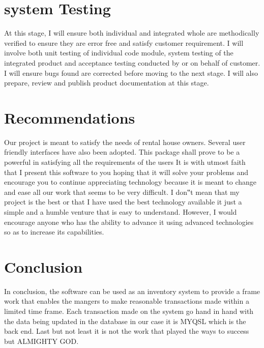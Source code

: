 \documentclass[]{report}
\begin{document}
\section{system Testing }
At this stage, I will ensure both individual and integrated whole are methodically verified to ensure they are error free and satisfy customer requirement. I will involve both unit testing of individual code module, system testing of the integrated product and acceptance testing conducted by or on behalf of customer. I will ensure bugs found are corrected before moving to the next stage. I will also prepare, review and publish product documentation at this stage. 

\section{Recommendations}
Our project is meant to satisfy the needs of rental house owners. Several user friendly interfaces have also been adopted. This package shall prove to be a powerful in satisfying all the requirements of the users It is with utmost faith that I present this software to you hoping that it will solve your problems and encourage you to continue appreciating technology because it is meant to change and ease all our work that seems to be very difficult. I don‟t mean that my project is the best or that I have used the best technology available it just a simple and a humble venture that is easy to understand. However, I would encourage anyone who has the ability to advance it using advanced technologies so as to increase its capabilities.

\section{Conclusion}
In conclusion, the software can be used as an inventory system to provide a frame work that enables the mangers to make reasonable transactions made within a limited time frame. Each transaction made on the system go hand in hand with the data being updated in the database in our case it is MYQSL which is the back end. Last but not least it is not the work that played the ways to success but ALMIGHTY GOD.





        
\end{document}
